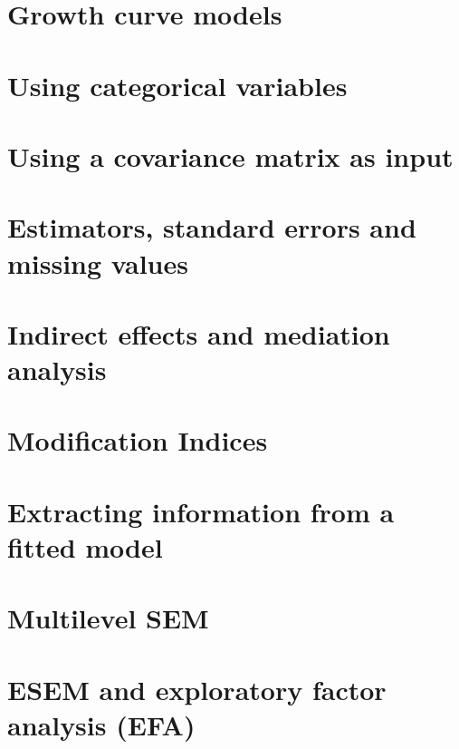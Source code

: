 \documentclass{article}
\begin{document}
\section{Growth curve models}

\section{Using categorical variables}

\section{Using a covariance matrix as input}

\section{Estimators, standard errors and missing values}

\section{Indirect effects and mediation analysis}

\section{Modification Indices}

\section{Extracting information from a fitted model}

\section{Multilevel SEM}

\section{ESEM and exploratory factor analysis (EFA)}

\end{document}

